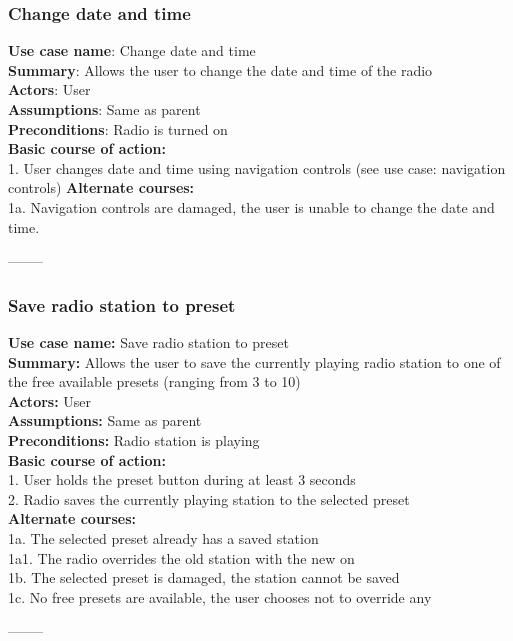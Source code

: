 \documentclass[11pt]{article}
\begin{document}
\subsubsection{Change date and time}
\textbf{Use case name}: Change date and time\\
\textbf{Summary}: Allows the user to change the date and time of the radio\\
\textbf{Actors}: User\\
\textbf{Assumptions}: Same as parent\\
\textbf{Preconditions}: Radio is turned on\\
\textbf{Basic course of action:}\\
\hspace*{10mm}1. User changes date and time using navigation controls (see use case: navigation controls)
\textbf{Alternate courses: }\\
\hspace*{10mm}1a. Navigation controls are damaged, the user is unable to change the date and time.
\begin{center}--------\end{center}

\subsubsection{Save radio station to preset}
\textbf{Use case name:} Save radio station to preset\\
\textbf{Summary:} Allows the user to save the currently playing radio station to one of the free available presets (ranging from 3 to 10)\\
\textbf{Actors:} User\\
\textbf{Assumptions:} Same as parent\\
\textbf{Preconditions:} Radio station is playing\\
\textbf{Basic course of action:}\\
\hspace*{10mm}1. User holds the preset button during at least 3 seconds\\
\hspace*{10mm}2. Radio saves the currently playing station to the selected preset\\
\textbf{Alternate courses:}\\
\hspace*{10mm}1a. The selected preset already has a saved station\\
\hspace*{20mm}1a1. The radio overrides the old station with the new on\\
\hspace*{10mm}1b. The selected preset is damaged, the station cannot be saved\\
\hspace*{10mm}1c. No free presets are available, the user chooses not to override any
\begin{center}--------\end{center}
\end{document}
